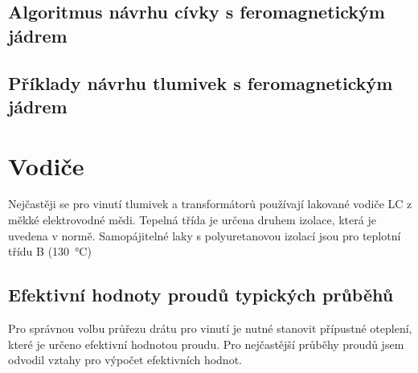     \subsection{Algoritmus návrhu cívky s feromagnetickým jádrem}
      
    \subsection{Příklady návrhu tlumivek s feromagnetickým jádrem}
        
    
  \section{Vodiče}
    Nejčastěji se pro vinutí tlumivek a transformátorů používají lakované vodiče LC z měkké 
    elektrovodné mědi. Tepelná třída je určena druhem izolace, která je uvedena v normě. 
    Samopájitelné laky s polyuretanovou izolací jsou pro teplotní třídu B (\SI{130}{\celsius})
    
  \subsection{Efektivní hodnoty proudů typických prů\-bě\-hů}
    Pro správnou volbu průřezu drátu pro vinutí je nutné stanovit přípustné oteplení, které je 
    určeno efektivní hodnotou proudu. Pro nejčastější průběhy proudů jsem odvodil vztahy pro 
    výpočet efektivních hodnot.

